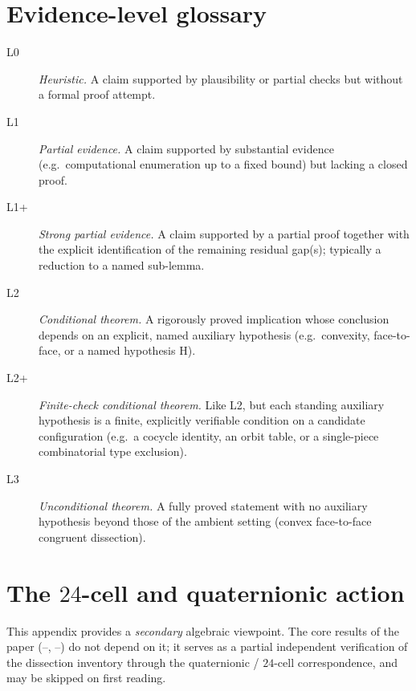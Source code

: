 \documentclass[11pt,a4paper]{article}
\theoremstyle{plain}
\theoremstyle{definition}
\theoremstyle{remark}
\begin{document}
\section{Evidence-level glossary}\label{app:evidence}\label{sec:evidence-glossary}

\begin{description}
\item[\textsf{L0}]
  \emph{Heuristic.}  A claim supported by plausibility or partial checks
  but without a formal proof attempt.
\item[\textsf{L1}]
  \emph{Partial evidence.}  A claim supported by substantial evidence
  (e.g.\ computational enumeration up to a fixed bound) but lacking a
  closed proof.
\item[\textsf{L1+}]
  \emph{Strong partial evidence.}  A claim supported by a partial proof
  together with the explicit identification of the remaining residual
  gap(s); typically a reduction to a named sub-lemma.
\item[\textsf{L2}]
  \emph{Conditional theorem.}  A rigorously proved implication whose
  conclusion depends on an explicit, named auxiliary hypothesis (e.g.\
  convexity, face-to-face, or a named hypothesis H).
\item[\textsf{L2+}]
  \emph{Finite-check conditional theorem.}  Like \textsf{L2}, but each
  standing auxiliary hypothesis is a finite, explicitly verifiable
  condition on a candidate configuration (e.g.\ a cocycle identity,
  an orbit table, or a single-piece combinatorial type exclusion).
\item[\textsf{L3}]
  \emph{Unconditional theorem.}  A fully proved statement with no
  auxiliary hypothesis beyond those of the ambient setting (convex
  face-to-face congruent dissection).
\end{description}

\section{The \texorpdfstring{$24$}{24}-cell and quaternionic action}\label{app:24cell}

This appendix provides a \emph{secondary} algebraic viewpoint.  The core
results of the paper (\Cref{sec:atlas}--\Cref{sec:burnside},
--) do not depend on it; it serves as a
partial independent verification of the dissection inventory through the
quaternionic / $24$-cell correspondence, and may be skipped on first
reading.
\end{document}
